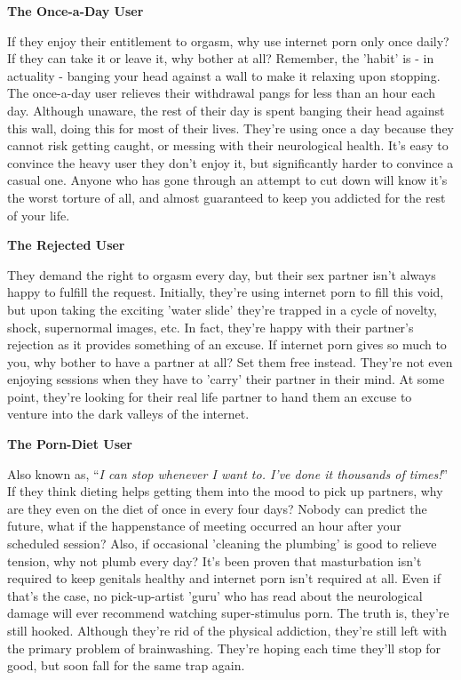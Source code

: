 \documentclass[
]{book}
\begin{document}
\textbf{The Once-a-Day User}

If they enjoy their entitlement to orgasm, why use internet porn only once daily? If they can take it or leave it, why bother at all? Remember, the 'habit' is - in actuality - banging your head against a wall to make it relaxing upon stopping. The once-a-day user relieves their withdrawal pangs for less than an hour each day. Although unaware, the rest of their day is spent banging their head against this wall, doing this for most of their lives. They're using once a day because they cannot risk getting caught, or messing with their neurological health. It's easy to convince the heavy user they don't enjoy it, but significantly harder to convince a casual one. Anyone who has gone through an attempt to cut down will know it's the worst torture of all, and almost guaranteed to keep you addicted for the rest of your life.

\textbf{The Rejected User}

They demand the right to orgasm every day, but their sex partner isn't always happy to fulfill the request. Initially, they're using internet porn to fill this void, but upon taking the exciting 'water slide' they're trapped in a cycle of novelty, shock, supernormal images, etc. In fact, they're happy with their partner's rejection as it provides something of an excuse. If internet porn gives so much to you, why bother to have a partner at all? Set them free instead. They're not even enjoying sessions when they have to 'carry' their partner in their mind. At some point, they're looking for their real life partner to hand them an excuse to venture into the dark valleys of the internet.

\textbf{The Porn-Diet User}

Also known as, ``\emph{I can stop whenever I want to. I've done it thousands of times!}''
If they think dieting helps getting them into the mood to pick up partners, why are they even on the diet of once in every four days? Nobody can predict the future, what if the happenstance of meeting occurred an hour after your scheduled session? Also, if occasional 'cleaning the plumbing' is good to relieve tension, why not plumb every day? It's been proven that masturbation isn't required to keep genitals healthy and internet porn isn't required at all. Even if that's the case, no pick-up-artist 'guru' who has read about the neurological damage will ever recommend watching super-stimulus porn. The truth is, they're still hooked. Although they're rid of the physical addiction, they're still left with the primary problem of brainwashing. They're hoping each time they'll stop for good, but soon fall for the same trap again.
\end{document}
